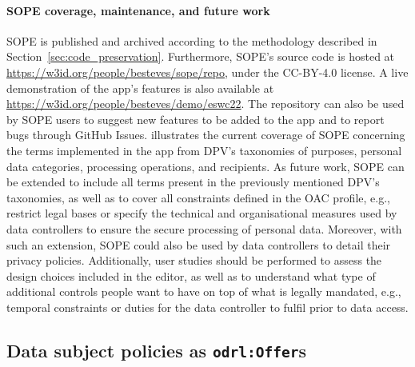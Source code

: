 \paragraph{SOPE coverage, maintenance, and future work}
SOPE is published and archived according to the methodology described in Section~\ref{sec:code_preservation}.
Furthermore, SOPE's source code is hosted at \url{https://w3id.org/people/besteves/sope/repo}, under the CC-BY-4.0 license.
A live demonstration of the app's features is also available at \url{https://w3id.org/people/besteves/demo/eswc22}.
The repository can also be used by SOPE users to suggest new features to be added to the app and to report bugs through GitHub Issues.
 illustrates the current coverage of SOPE concerning the terms implemented in the app from DPV's taxonomies of purposes, personal data categories, processing operations, and recipients.
As future work, SOPE can be extended to include all terms present in the previously mentioned DPV's taxonomies, as well as to cover all constraints defined in the OAC profile, e.g., restrict legal bases or specify the technical and organisational measures used by data controllers to ensure the secure processing of personal data.
Moreover, with such an extension, SOPE could also be used by data controllers to detail their privacy policies.
Additionally, user studies should be performed to assess the design choices included in the editor, as well as to understand what type of additional controls people want to have on top of what is legally mandated, e.g., temporal constraints or duties for the data controller to fulfil prior to data access.

\subsection{Data subject policies as \texttt{odrl:Offer}s}
\label{sec:algorithm-offer}

